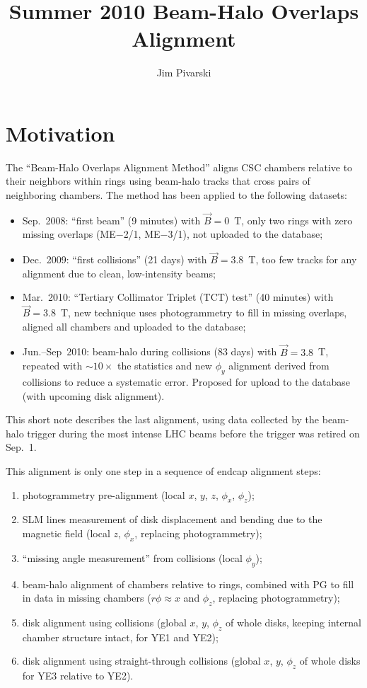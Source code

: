 \documentclass[12pt]{article}
\title{Summer 2010 Beam-Halo Overlaps Alignment}
\author{Jim Pivarski}
\begin{document}
\maketitle

\section{Motivation}

The ``Beam-Halo Overlaps Alignment Method'' aligns CSC chambers
relative to their neighbors within rings using beam-halo tracks that
cross pairs of neighboring chambers.  The method has been applied to
the following datasets:
\begin{itemize}
\item Sep.~2008: ``first beam'' (9 minutes) with $\vec{B}=0$~T, only
  two rings with zero missing overlaps (ME$-$2/1, ME$-$3/1), not
  uploaded to the database;
\item Dec.~2009: ``first collisions'' (21 days) with $\vec{B}=3.8$~T,
  too few tracks for any alignment due to clean, low-intensity beams;
\item Mar.~2010: ``Tertiary Collimator Triplet (TCT) test'' (40
  minutes) with $\vec{B}=3.8$~T, new technique uses photogrammetry
  to fill in missing overlaps, aligned all chambers and uploaded
  to the database;
\item Jun.--Sep~2010: beam-halo during collisions (83 days) with
  $\vec{B}=3.8$~T, repeated with \mbox{$\sim 10\times$} the statistics
  and new $\phi_y$ alignment derived from collisions to reduce a
  systematic error.  Proposed for upload to the database (with
  upcoming disk alignment).
\end{itemize}
This short note describes the last alignment, using data collected by
the beam-halo trigger during the most intense LHC beams before the
trigger was retired on Sep.~1.

This alignment is only one step in a sequence of endcap alignment
steps:
\begin{enumerate}
\item photogrammetry pre-alignment (local $x$, $y$, $z$, $\phi_x$, $\phi_z$);
\item SLM lines measurement of disk displacement and bending due to
  the magnetic field (local $z$, $\phi_x$, replacing photogrammetry);
\item ``missing angle measurement'' from collisions (local $\phi_y$);
\item beam-halo alignment of chambers relative to rings, combined with
  PG to fill in data in missing chambers ($r\phi \approx x$ and $\phi_z$, replacing photogrammetry);
\item disk alignment using collisions (global $x$, $y$, $\phi_z$ of
  whole disks, keeping internal chamber structure intact, for YE1 and
  YE2);
\item disk alignment using straight-through collisions (global $x$,
  $y$, $\phi_z$ of whole disks for YE3 relative to YE2).
\end{enumerate}
\end{document}
